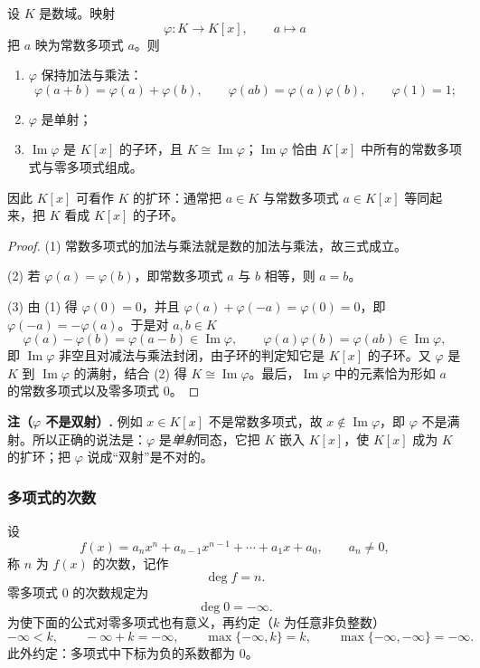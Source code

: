 \begin{theorem}[多项式环是基环的扩环]
设 \(K\) 是数域。映射
\[
\varphi:K\longrightarrow K[x],\qquad a\longmapsto a
\]
把 \(a\) 映为常数多项式 \(a\)。则
\begin{enumerate}[label=(\arabic*)]
  \item \(\varphi\) 保持加法与乘法：
  \[
  \varphi(a+b)=\varphi(a)+\varphi(b),\qquad
  \varphi(ab)=\varphi(a)\varphi(b),\qquad
  \varphi(1)=1;
  \]
  \item \(\varphi\) 是单射；
  \item \(\operatorname{Im}\varphi\) 是 \(K[x]\) 的子环，且 \(K\cong\operatorname{Im}\varphi\)；\(\operatorname{Im}\varphi\) 恰由 \(K[x]\) 中所有的常数多项式与零多项式组成。
\end{enumerate}
因此 \(K[x]\) 可看作 \(K\) 的扩环：通常把 \(a\in K\) 与常数多项式 \(a\in K[x]\) 等同起来，把 \(K\) 看成 \(K[x]\) 的子环。
\end{theorem}

\begin{proof}
(1) 常数多项式的加法与乘法就是数的加法与乘法，故三式成立。

(2) 若 \(\varphi(a)=\varphi(b)\)，即常数多项式 \(a\) 与 \(b\) 相等，则 \(a=b\)。

(3) 由 (1) 得 \(\varphi(0)=0\)，并且 \(\varphi(a)+\varphi(-a)=\varphi(0)=0\)，即 \(\varphi(-a)=-\varphi(a)\)。于是对 \(a,b\in K\)
\[
\varphi(a)-\varphi(b)=\varphi(a-b)\in\operatorname{Im}\varphi,\qquad
\varphi(a)\varphi(b)=\varphi(ab)\in\operatorname{Im}\varphi,
\]
即 \(\operatorname{Im}\varphi\) 非空且对减法与乘法封闭，由子环的判定知它是 \(K[x]\) 的子环。又 \(\varphi\) 是 \(K\) 到 \(\operatorname{Im}\varphi\) 的满射，结合 (2) 得 \(K\cong\operatorname{Im}\varphi\)。最后，\(\operatorname{Im}\varphi\) 中的元素恰为形如 \(a\) 的常数多项式以及零多项式 \(0\)。
\end{proof}

\noindent\textbf{注（\(\varphi\) 不是双射）.} 例如 \(x\in K[x]\) 不是常数多项式，故 \(x\notin\operatorname{Im}\varphi\)，即 \(\varphi\) 不是满射。所以正确的说法是：\(\varphi\) 是\emph{单射}同态，它把 \(K\) 嵌入 \(K[x]\)，使 \(K[x]\) 成为 \(K\) 的扩环；把 \(\varphi\) 说成“双射”是不对的。

\subsubsection{多项式的次数}

\begin{definition}[次数]
设
\[
f(x)=a_nx^n+a_{n-1}x^{n-1}+\cdots+a_1x+a_0,\qquad a_n\ne0,
\]
称 \(n\) 为 \(f(x)\) 的次数，记作
\[
\deg f=n .
\]
零多项式 \(0\) 的次数规定为
\[
\deg 0=-\infty .
\]
为使下面的公式对零多项式也有意义，再约定（\(k\) 为任意非负整数）
\[
-\infty<k,\qquad -\infty+k=-\infty,\qquad \max\{-\infty,k\}=k,\qquad \max\{-\infty,-\infty\}=-\infty .
\]
此外约定：多项式中下标为负的系数都为 \(0\)。
\end{definition}

